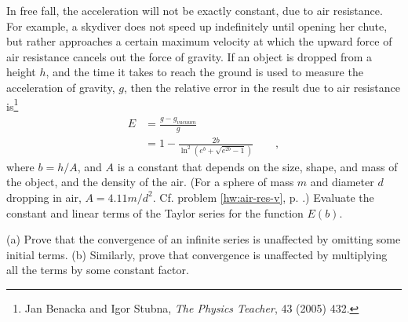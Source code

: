 \begin{hwsection}
\begin{hw}\label{hw:air-res-taylor}
In free fall, the acceleration will not be exactly constant, due to air resistance. For example,
a skydiver does not speed up indefinitely until opening her chute, but rather approaches a certain
maximum velocity at which the upward force of air resistance cancels out the force of gravity.
If an object is dropped from a height $h$, and the time it takes to reach the ground is used to
measure the acceleration of gravity, $g$, then the relative error in the result due to air
resistance is\footnote{Jan Benacka
and Igor Stubna, \emph{The Physics Teacher}, 43 (2005) 432.}
\begin{align*}
  E &= \frac{g-g_{vacuum}}{g} \\
   & = 1-\frac{2b}{\ln^2\left(e^b+\sqrt{e^{2b}-1}\right)} \qquad ,
\end{align*}
where $b=h/A$, and
$A$ is a constant that depends on the size, shape, and mass of the object, and the density of
the air.   (For a sphere of mass $m$ and diameter $d$ dropping in air, $A=4.11m/d^2$. Cf. problem \ref{hw:air-res-v}, p. \pageref{hw:air-res-v}.)
Evaluate the constant and linear terms of the Taylor series for the function $E(b)$.
\end{hw}

\begin{hw}
(a) Prove that the convergence of an infinite series is unaffected by omitting
some initial terms. (b) Similarly, prove that convergence is unaffected by
multiplying all the terms by some constant factor.
\end{hw}


\end{hwsection}
